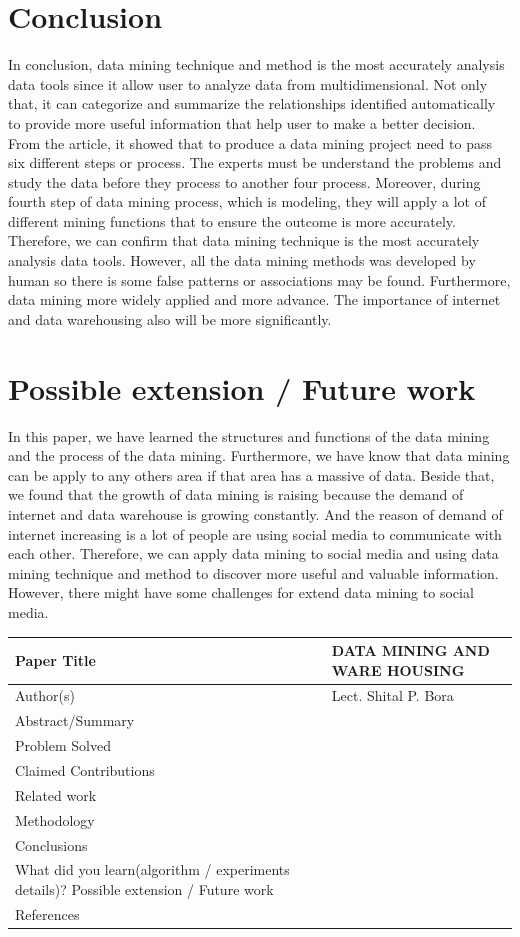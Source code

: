 \documentclass[a4paper,12pt]{article}
\begin{document}
\section{Conclusion}
\hspace*{1cm}In conclusion, data mining technique and method is the most accurately analysis data tools since it allow user to analyze data from multidimensional. Not only that, it can categorize and summarize the relationships identified automatically to provide more useful information that help user to make a better decision. From the article, it showed that to produce a data mining project need to pass six different steps or process. The experts must be understand the problems and study the data before they process to another four process. Moreover, during fourth step of data mining process, which is modeling, they will apply a lot of different mining functions that to ensure the outcome is more accurately. Therefore, we can confirm that data mining technique is the most accurately analysis data tools. However, all the data mining methods was developed by human so there is some false patterns or associations may be found. Furthermore, data mining more widely applied and more advance. The importance of internet and data warehousing also will be more significantly.  
\section{Possible extension / Future work}
\hspace{1cm}In this paper, we have learned the structures and functions of the data mining and the process of the data mining. Furthermore, we have know that data mining can be apply to any others area if that area has a massive of data. Beside that, we found that the growth of data mining is raising because the demand of internet and data warehouse is growing constantly. And the reason of demand of internet increasing is a lot of people are using social media to communicate with each other. Therefore, we can apply data mining to social media and using data mining technique and method to discover more useful and valuable information. However, there might have some challenges for extend data mining to social media.~\cite{smm2014}
{}
\newpage
\begin{flushleft}
\begin{tabular}{|m{52mm} | m{65mm} |}
\hline
Paper Title & DATA MINING AND WARE HOUSING \\
\hline
Author(s) & Lect. Shital P. Bora\\
\hline
Abstract/Summary & \\
\hline
Problem Solved & \\
\hline
Claimed Contributions & \\
\hline
Related work & \\
\hline
Methodology & \\
\hline
Conclusions & \\
\hline
What did you learn(algorithm / experiments details)? Possible extension / Future work & \\
\hline
References & \\
\hline
\end{tabular}
\end{flushleft}
\end{document}

